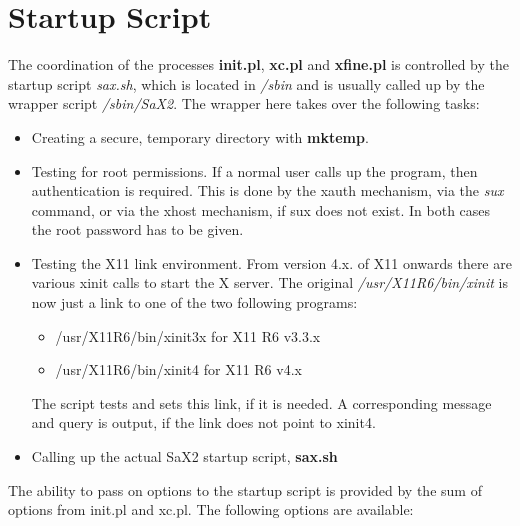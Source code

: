 \section{Startup Script}
\label{sec:sta}
The coordination of the processes \textbf{init.pl}, \textbf{xc.pl}
and \textbf{xfine.pl} is controlled by the startup script \textit{sax.sh}, 
which is located in \textit{/sbin} and is usually called up by the 
wrapper script \textit{/sbin/SaX2}. The wrapper here takes over the
following tasks:
\begin{itemize}
\item Creating a secure, temporary directory with \textbf{mktemp}. 
\item Testing for root permissions. If a normal user calls up the program,
  then authentication is required. This is done by the xauth mechanism, via
  the  \textit{sux} command, or via the xhost mechanism, if sux does not
  exist. In both cases the root password has to be given.  
\item Testing the X11 link environment. From version 4.x. of X11 onwards
  there are various xinit calls to start the X server. The original
  \textit{/usr/X11R6/bin/xinit} is now just a link to one of the two following
  programs:
      \begin{itemize}
      \item /usr/X11R6/bin/xinit3x for X11 R6 v3.3.x
      \item /usr/X11R6/bin/xinit4  for X11 R6 v4.x
      \end{itemize} 
      The script tests and sets this link, if it is needed. A corresponding
      message and query is output, if the link does not point to xinit4. 
\item Calling up the actual SaX2 startup script, \textbf{sax.sh}
\end{itemize}
The ability to pass on options to the startup script is provided by the sum of
options from init.pl and xc.pl.
The following options are available:
